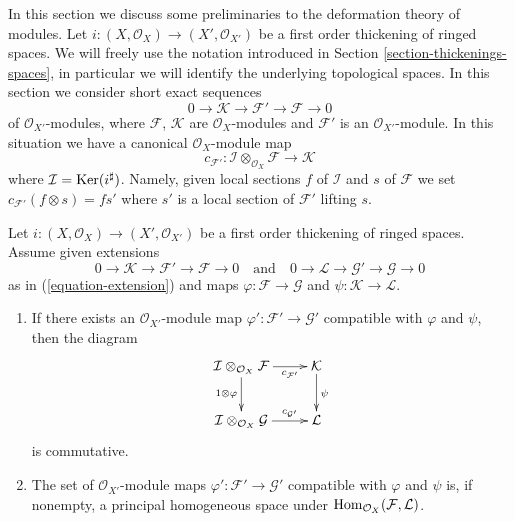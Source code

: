 \noindent
In this section we discuss some preliminaries to the deformation theory
of modules. Let $i : (X, \mathcal{O}_X) \to (X', \mathcal{O}_{X'})$
be a first order thickening of ringed spaces. We will freely use the notation
introduced in Section \ref{section-thickenings-spaces}, in particular we will
identify the underlying topological spaces.
In this section we consider short exact sequences
\begin{equation}
\label{equation-extension}
0 \to \mathcal{K} \to \mathcal{F}' \to \mathcal{F} \to 0
\end{equation}
of $\mathcal{O}_{X'}$-modules, where $\mathcal{F}$, $\mathcal{K}$ are
$\mathcal{O}_X$-modules and $\mathcal{F}'$ is an $\mathcal{O}_{X'}$-module.
In this situation we have a canonical $\mathcal{O}_X$-module map
$$
c_{\mathcal{F}'} :
\mathcal{I} \otimes_{\mathcal{O}_X} \mathcal{F}
\longrightarrow
\mathcal{K}
$$
where $\mathcal{I} = \mathop{\mathrm{Ker}}(i^\sharp)$.
Namely, given local sections $f$ of $\mathcal{I}$ and $s$
of $\mathcal{F}$ we set $c_{\mathcal{F}'}(f \otimes s) = fs'$
where $s'$ is a local section of $\mathcal{F}'$ lifting $s$.

\begin{lemma}
\label{lemma-inf-map}
Let $i : (X, \mathcal{O}_X) \to (X', \mathcal{O}_{X'})$
be a first order thickening of ringed spaces. Assume given
extensions
$$
0 \to \mathcal{K} \to \mathcal{F}' \to \mathcal{F} \to 0
\quad\text{and}\quad
0 \to \mathcal{L} \to \mathcal{G}' \to \mathcal{G} \to 0
$$
as in (\ref{equation-extension})
and maps $\varphi : \mathcal{F} \to \mathcal{G}$ and
$\psi : \mathcal{K} \to \mathcal{L}$.
\begin{enumerate}
\item If there exists an $\mathcal{O}_{X'}$-module
map $\varphi' : \mathcal{F}' \to \mathcal{G}'$ compatible with $\varphi$
and $\psi$, then the diagram
$$
\xymatrix{
\mathcal{I} \otimes_{\mathcal{O}_X} \mathcal{F}
\ar[r]_-{c_{\mathcal{F}'}} \ar[d]_{1 \otimes \varphi} &
\mathcal{K} \ar[d]^\psi \\
\mathcal{I} \otimes_{\mathcal{O}_X} \mathcal{G}
\ar[r]^-{c_{\mathcal{G}'}} &
\mathcal{L}
}
$$
is commutative.
\item The set of $\mathcal{O}_{X'}$-module
maps $\varphi' : \mathcal{F}' \to \mathcal{G}'$ compatible with $\varphi$
and $\psi$ is, if nonempty, a principal homogeneous space under
$\mathop{\mathrm{Hom}}\nolimits_{\mathcal{O}_X}(\mathcal{F}, \mathcal{L})$.
\end{enumerate}
\end{lemma}

